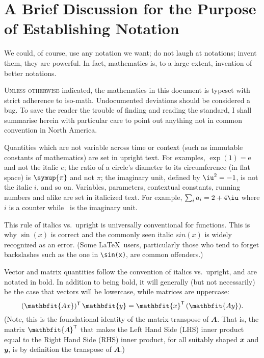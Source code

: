 %
\chapter{A Brief Discussion for the Purpose of Establishing Notation}%
\label{chap:notation}
\epigraph{
  We could, of course, use any notation we want; do not laugh at notations; invent them, they are powerful. In fact, mathematics is, to a large extent, invention of better notations.
}{
}

\lettrine{U}{nless otherwise} indicated, the mathematics in this document is
typeset with strict adherence to \ac{iso-math}.
Undocumented deviations should be considered a bug. To save the reader the
trouble of finding and reading the standard, I shall summarise herein with
particular care to point out anything not in common convention in North America.

Quantities which are not variable across time or context (such as immutable
constants of mathematics) are set in upright text. For examples, $\exp(1) =
\mathup{e}$ and not the italic $e$; the ratio of a circle's diameter to its
circumference (in flat space) is $\symup{\pi}$ and not $\pi$; the imaginary
unit, defined by $\iu^2=-1$, is not the italic $i$, and so on. Variables,
parameters, contextual constants, running numbers  and alike are set in
italicized text. For example, $\sum_i a_i = 2+4\iu$ where $i$\/ is a counter
while \iu\ is the imaginary unit.

This rule of italics vs.\ upright is universally conventional for functions.
This is why $\sin(x)$ is correct and the commonly seen italic $sin(x)$ is widely
recognized as an error. (Some \LaTeX\ users, particularly those who tend to
forget backslashes such as the one in \verb|\sin(x)|, are common offenders.)

Vector and matrix quantities follow the convention of italics vs.\ upright, and
are notated in bold. In addition to being bold, it will generally (but not
necessarily) be the case that vectors will be lowercase, while matrices are
uppercase:
\begin{equation}\label{eq:transpose}
  (\mathbfit{Ax})\tr\,\mathbfit{y} = \mathbfit{x}\tr\,(\mathbfit{Ay}).
\end{equation}
(Note, this is the foundational identity of the matrix-transpose of
$\mathbfit{A}$. That is, the matrix $\mathbfit{A}\tr$ that makes the Left Hand
Side (LHS) inner product equal to the Right Hand Side (RHS) inner product, for
all suitably shaped $\mathbfit{x}$ and $\mathbfit{y}$, is by definition the
transpose of $\mathbfit{A}$.)

